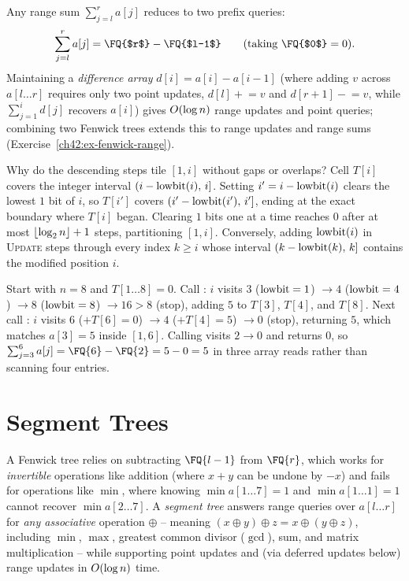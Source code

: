Any range sum $\sum_{j=l}^r a[j]$ reduces to two prefix queries:
\[
  \sum_{j=l}^r a[j] = \FQ{$r$} - \FQ{$l-1$} \qquad (\text{taking } \FQ{$0$} = 0).
\]
Maintaining a \emph{difference array} $d[i] = a[i] - a[i-1]$ (where adding $v$ across $a[l\dots r]$ requires only two point updates, $d[l] \mathrel{+}= v$ and $d[r+1] \mathrel{-}= v$, while $\sum_{j=1}^i d[j]$ recovers $a[i]$) gives $O(\log n)$ range updates and point queries; combining two Fenwick trees extends this to range updates and range sums (Exercise~\ref{ch42:ex-fenwick-range}).

\begin{whybox}
Why do the descending steps tile $[1,i]$ without gaps or overlaps? Cell $T[i]$ covers the integer interval $(i - \operatorname{lowbit}(i),\, i]$. Setting $i' = i - \operatorname{lowbit}(i)$ clears the lowest $1$ bit of $i$, so $T[i']$ covers $(i' - \operatorname{lowbit}(i'),\, i']$, ending at the exact boundary where $T[i]$ began. Clearing $1$ bits one at a time reaches $0$ after at most $\lfloor\log_2 n\rfloor + 1$ steps, partitioning $[1,i]$. Conversely, adding $\operatorname{lowbit}(i)$ in \textsc{Update} steps through every index $k \ge i$ whose interval $(k - \operatorname{lowbit}(k),\, k]$ contains the modified position $i$.
\end{whybox}

\begin{labbox}
Start with $n=8$ and $T[1\dots 8] = 0$. Call : $i$ visits $3$ ($\operatorname{lowbit}=1$) $\to 4$ ($\operatorname{lowbit}=4$) $\to 8$ ($\operatorname{lowbit}=8$) $\to 16 > 8$ (stop), adding $5$ to $T[3]$, $T[4]$, and $T[8]$. Next call : $i$ visits $6$ ($+T[6]=0$) $\to 4$ ($+T[4]=5$) $\to 0$ (stop), returning $5$, which matches $a[3]=5$ inside $[1,6]$. Calling  visits $2 \to 0$ and returns $0$, so $\sum_{j=3}^6 a[j] = \FQ{6} - \FQ{2} = 5 - 0 = 5$ in three array reads rather than scanning four entries.
\end{labbox}

\section{Segment Trees}
\label{ch42:segtree}

A Fenwick tree relies on subtracting $\FQ{l-1}$ from $\FQ{r}$, which works for \emph{invertible} operations like addition (where $x + y$ can be undone by $-x$) and fails for operations like $\min$, where knowing $\min a[1\dots 7] = 1$ and $\min a[1\dots 1] = 1$ cannot recover $\min a[2\dots 7]$. A \emph{segment tree} answers range queries over $a[l\dots r]$ for \emph{any associative} operation $\oplus$ -- meaning $(x \oplus y) \oplus z = x \oplus (y \oplus z)$, including $\min$, $\max$, greatest common divisor ($\gcd$), sum, and matrix multiplication -- while supporting point updates and (via deferred updates below) range updates in $O(\log n)$ time.

